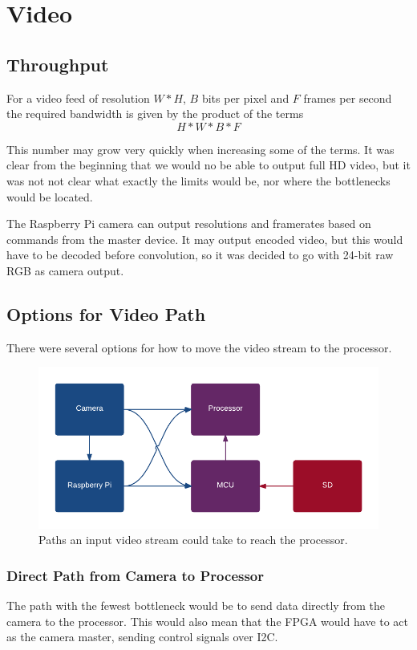 \clearpage
\section{Video}
\subsection{Throughput}
For a video feed of resolution $W*H$, $B$ bits per pixel and $F$ frames per second the required bandwidth is given by the product of the terms
\[
    H * W * B * F
\]

This number may grow very quickly when increasing some of the terms.
It was clear from the beginning that we would no be able to output full HD video,
but it was not not clear what exactly the limits would be, nor where the bottlenecks would be located.

The Raspberry Pi camera can output resolutions and framerates based on commands from the master device.
It may output encoded video, but this would have to be decoded before convolution,
so it was decided to go with 24-bit raw RGB as camera output.

\subsection{Options for Video Path}
There were several options for how to move the video stream to the processor.

\begin{figure}[h]
    \centering
    \includegraphics[width=\linewidth]{img/VideoPath}
    \caption{Paths an input video stream could take to reach the processor.}
    \label{fig:VideoPath}
\end{figure}

\subsubsection{Direct Path from Camera to Processor}
The path with the fewest bottleneck would be to send data directly from the camera to the processor.
This would also mean that the FPGA would have to act as the camera master,
sending control signals over I2C.

